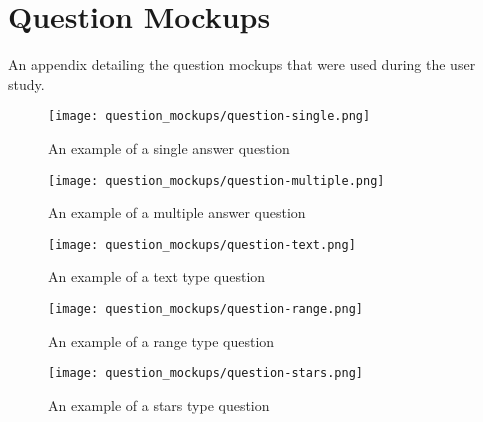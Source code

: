 \chapter{Question Mockups} \label{App:Question Mockups}

\begin{preamble}
	An appendix detailing the question mockups that were used during the user study.
\end{preamble}


\begin{figure}[h]
	\centering
		\texttt{[image: question\_mockups/question-single.png]}
	\caption{\label{Figure:Mockups_single} An example of a single answer question}
\end{figure}


\begin{figure}[h]
	\centering
		\texttt{[image: question\_mockups/question-multiple.png]}
	\caption{\label{Figure:Mockups_multiple} An example of a multiple answer question}
\end{figure}

\begin{figure}[h]
	\centering
		\texttt{[image: question\_mockups/question-text.png]}
	\caption{\label{Figure:Mockups_text} An example of a text type question}
\end{figure}

\begin{figure}[h]
	\centering
		\texttt{[image: question\_mockups/question-range.png]}
	\caption{\label{Figure:Mockups_range} An example of a range type question}
\end{figure}

\begin{figure}[h]
	\centering
		\texttt{[image: question\_mockups/question-stars.png]}
	\caption{\label{Figure:Mockups_stars} An example of a stars type question}
\end{figure}
